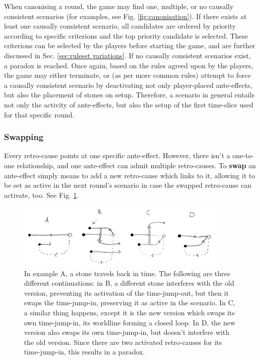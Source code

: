 \documentclass[12pt]{article}
\begin{document}
	When canonising a round, the game may find one, multiple, or no causally consistent scenarios (for examples, see Fig. \ref{fig:canonisation}). If there exists at least one causally consistent scenario, all candidates are ordered by priority according to specific criterions and the top priority candidate is selected. These criterions can be selected by the players before starting the game, and are further discussed in Sec. \ref{sec:ruleset variations}. If no causally consistent scenarios exist, a paradox is reached. Once again, based on the rules agreed upon by the players, the game may either terminate, or (as per more common rules) attempt to force a causally consistent scenario by deactivating not only player-placed ante-effects, but also the placement of stones on setup. Therefore, a scenario in general entails not only the activity of ante-effects, but also the setup of the first time-slice used for that specific round.
	
	
	\subsubsection{Swapping}\label{sec:swapping}
	Every retro-cause points at one specific ante-effect. However, there isn't a one-to-one relationship, and one ante-effect can admit multiple retro-causes. To \textbf{swap} an ante-effect simply means to add a new retro-cause which links to it, allowing it to be set as active in the next round's scenario in case the swapped retro-cause can activate, too. See Fig. \ref{fig:swapping}.
	
	\begin{figure}[h]
\begin{center}
    \includegraphics[width=0.9\textwidth]{images/diag_swapping}
 \caption{In example A, a stone travels back in time. The following are three different continuations: in B, a different stone interferes with the old version, preventing its activation of the time-jump-out, but then it swaps the time-jump-in, preserving it as active in the scenario. In C, a similar thing happens, except it is the new version which swaps its own time-jump-in, its worldline forming a closed loop. In D, the new version also swaps its own time-jump-in, but doesn't interfere with the old version. Since there are two activated retro-causes for its time-jump-in, this results in a paradox.}\label{fig:swapping}
\end{center}
\end{figure}
\end{document}

